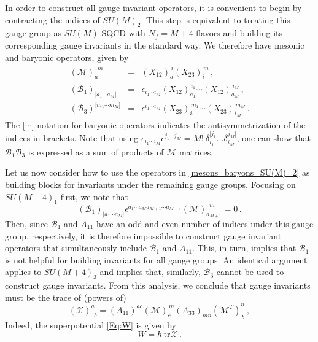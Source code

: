 \documentclass[a4paper,12pt]{article}
\begin{document}
In order to construct all gauge invariant operators, it is convenient to begin by contracting the indices of $SU(M)_2$. This step is equivalent to treating this gauge group as $SU(M)$ SQCD with $N_f = M+4$ flavors and building its corresponding gauge invariants in the standard way. We therefore have mesonic and baryonic operators, given by
	\begin{equation}
		\begin{array}{rcl}
			(\mathcal{M})_a^{\,\,\, m} &=& (X_{12})_a^{\,i} (X_{23})_i^{\,m} \, , \\[.1 cm]
			(\mathcal{B}_{1})_{\lbrack a_1 \cdots a_M\rbrack} &=& \epsilon_{i_1 \cdots i_{M}}(X_{12})_{a_1}^{\,i_1}\cdots (X_{12})_{a_M}^{\,i_M} \, , \\[.1 cm]
			(\mathcal{B}_{3})^{\lbrack m_1 \cdots m_M\rbrack} &=& \epsilon^{i_1 \cdots i_{M}}(X_{23})_{i_1}^{\, m_1}\cdots (X_{23})_{i_M}^{\, m_M} \, .
		\end{array}
		\label{mesons_baryons_SU(M)_2}
	\end{equation}
The $\lbrack\cdots \rbrack$ notation for baryonic operators indicates the antisymmetrization of the indices in brackets. Note that using $\epsilon_{i_1 \cdots i_{M}}\epsilon^{j_1 \cdots j_{M}}=M!\  \delta^{[j_1}_{i_1}\dots \delta^{j_M]}_{i_M}$, one can show that $\mathcal{B}_{1}\mathcal{B}_{3}$ is expressed as a sum of products of $\mathcal{M}$ matrices. 

Let us now consider how to use the operators in \eqref{mesons_baryons_SU(M)_2} as building blocks for invariants under the remaining gauge groups. Focusing on $SU(M+4)_1$ first, we note that
	\begin{equation}
		(\mathcal{B}_{1})_{\lbrack a_1 \cdots a_M\rbrack} \epsilon^{a_1 \cdots a_M a_{M+1} \cdots a_{M+4}} (\mathcal{M})_{a_{M+1}}^{\,\,\, m} = 0 \, .
	\end{equation}
Then, since $\mathcal{B}_1$ and $A_{11}$ have an odd and even number of indices under this gauge group, respectively, it is therefore impossible to construct gauge invariant operators that simultaneously include $\mathcal{B}_1$ and $A_{11}$. This, in turn, implies that $\mathcal{B}_1$ is not helpful for building invariants for all gauge groups. An identical argument applies to $SU(M+4)_3$ and implies that, similarly, $\mathcal{B}_3$ cannot be used to construct gauge invariants. From this analysis, we conclude that gauge invariants must be the trace of (powers of)
	\begin{equation}
	(\mathcal{X})^{a}_{\, \, \, b} = (A_{11})^{ac}(\mathcal{M})_{c}^{\, m} (A_{33})_{mn} (\mathcal{M}^T)_{\, b}^n ~ ,
	\end{equation}
Indeed, the superpotential \eqref{Eq:W} is given by
\begin{equation}
		W = h \, \mathrm{tr} \mathcal{X} \, .
		\label{W_1}
	\end{equation}
\end{document}
